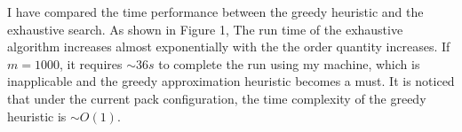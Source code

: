 \documentclass[a4paper]{article}
\begin{document}
I have compared the time performance between the greedy heuristic and the exhaustive search. As shown in Figure 1,
The run time of the exhaustive algorithm increases almost exponentially with the the order quantity increases. If $m=1000$, it requires $\sim 36s$ to complete the run using my machine, which is inapplicable and the greedy approximation heuristic becomes a must. It is noticed that under the current pack configuration, the time complexity of the greedy heuristic is $\sim O(1)$.
\end{document}
